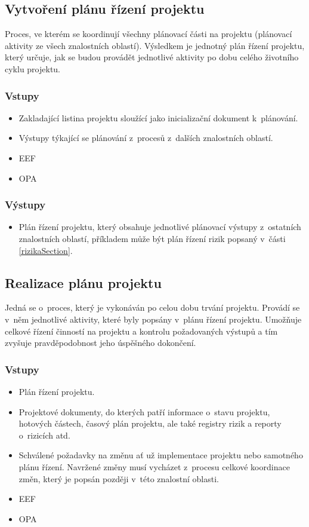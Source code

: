 \subsection*{Vytvoření plánu řízení projektu}

Proces, ve kterém se koordinují všechny plánovací části na projektu (plánovací aktivity ze všech znalostních oblastí). Výsledkem je jednotný plán řízení projektu, který určuje, jak se budou provádět jednotlivé aktivity po dobu celého životního cyklu projektu. 

\subsubsection*{Vstupy}
\begin{itemize}
    \item Zakladající listina projektu sloužící jako inicializační dokument k~plánování.
    \item Výstupy týkající se plánování z~procesů z~dalších znalostních oblastí.
    \item EEF
    \item OPA
\end{itemize}
\subsubsection*{Výstupy}
\begin{itemize}
    \item Plán řízení projektu, který obsahuje jednotlivé plánovací výstupy z~ostatních znalostních oblastí, příkladem může být plán řízení rizik popsaný v~části \ref{rizikaSection}.
\end{itemize}

\subsection*{Realizace plánu projektu}

Jedná se o~proces, který je vykonáván po celou dobu trvání projektu. Provádí se v~něm jednotlivé aktivity, které byly popsány v~plánu řízení projektu. Umožňuje celkové řízení činností na projektu a kontrolu požadovaných výstupů a tím zvyšuje pravděpodobnost jeho úspěšného dokončení.  

\subsubsection*{Vstupy}
\begin{itemize}
    \item Plán řízení projektu.
    \item Projektové dokumenty, do kterých patří informace o~stavu projektu, hotových částech, časový plán projektu, ale také registry rizik a reporty o~rizicích atd.
    \item Schválené požadavky na změnu ať už implementace projektu nebo samotného plánu řízení. Navržené změny musí vycházet z~procesu celkové koordinace změn, který je popsán později v~této znalostní oblasti.
    \item EEF
    \item OPA
\end{itemize}
